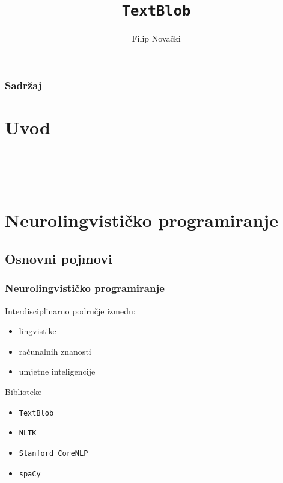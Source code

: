 \documentclass[10pt, aspectratio=169]{beamer}
\title{\texttt{TextBlob}}
\author{Filip Novački}
\institute{Fakultet organizacije i informatike}
\begin{document}
\frame{\titlepage}

\begin{frame}
	\frametitle{Sadržaj}

	\tableofcontents

\end{frame}

\section{Uvod}

\begin{frame}
	\frametitle{}

	\\[15pt]\pause

	\\

\end{frame}

\section{Neurolingvističko programiranje}

\subsection{Osnovni pojmovi}

\begin{frame}
	\frametitle{Neurolingvističko programiranje}

	\begin{exampleblock}{Interdisciplinarno područje između:}

	\begin{itemize}
		\item lingvistike
		\item računalnih znanosti
		\item umjetne inteligencije
	\end{itemize}
	\end{exampleblock}

	\begin{alertblock}{Biblioteke}
		\begin{itemize}
			\item \texttt{TextBlob}
			\item \texttt{NLTK}
			\item \texttt{Stanford CoreNLP}
			\item \texttt{spaCy}
		\end{itemize}
	\end{alertblock}
\end{frame}
\end{document}

